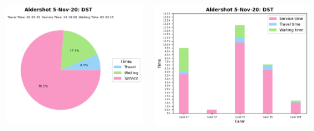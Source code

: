 \documentclass[usenames,dvipsnames]{beamer}
\begin{document}
\begin{frame}
\begin{columns}
\begin{minipage}[c][0.45\textheight][c]{\linewidth}
		\end{minipage}
		\begin{minipage}[c][0.45\textheight][c]{\linewidth}
			\centering
			\includegraphics[width=1\linewidth]{figures/5_Nov_20_Aldershot_time_info_dst}
		\end{minipage}
		\begin{minipage}[c][0.45\textheight][c]{\linewidth}
			\vspace{5mm}
			\centering
			\includegraphics[width=1\linewidth]{figures/5_Nov_20_Aldershot_workload_dst}
		\end{minipage}
	\end{columns}
\end{frame}
\end{document}
